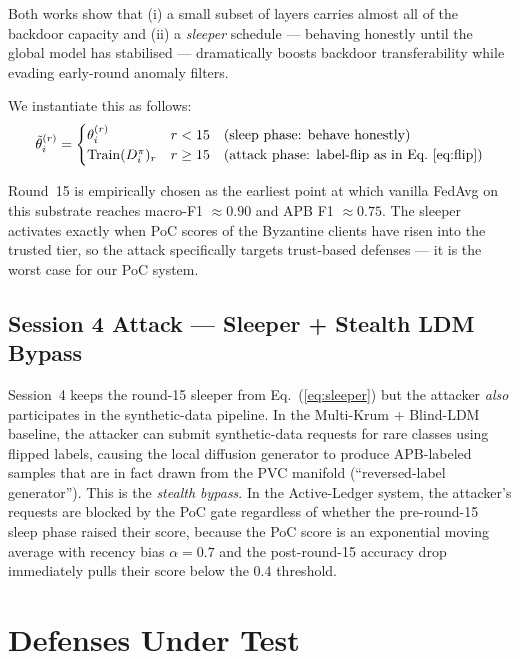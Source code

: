 \documentclass[11pt,a4paper]{article}
\begin{document}
Both works show that (i) a small subset of layers carries almost all of
the backdoor capacity and (ii) a \textit{sleeper} schedule --- behaving
honestly until the global model has stabilised --- dramatically boosts
backdoor transferability while evading early-round anomaly filters.

We instantiate this as follows:
\begin{equation}
\tilde{\theta}_{i}^{(r)} =
\begin{cases}
\theta_i^{(r)} & r < 15 \quad \text{(sleep phase: behave honestly)}\\
\operatorname{Train}(D_i^{\pi})_{r} & r \geq 15 \quad \text{(attack phase: label-flip as in Eq.~\ref{eq:flip})}
\end{cases}
\label{eq:sleeper}
\end{equation}

\begin{findingbox}
Round~15 is empirically chosen as the earliest point at which
vanilla FedAvg on this substrate reaches macro-F1 $\approx 0.90$ and
APB F1 $\approx 0.75$. The sleeper activates exactly when PoC scores
of the Byzantine clients have risen into the trusted tier, so the
attack specifically targets trust-based defenses --- it is the worst
case for our PoC system.
\end{findingbox}

\subsection{Session 4 Attack --- Sleeper + Stealth LDM Bypass}

Session~4 keeps the round-15 sleeper from Eq.~(\ref{eq:sleeper}) but the
attacker \textit{also} participates in the synthetic-data pipeline.
In the Multi-Krum + Blind-LDM baseline, the attacker can submit
synthetic-data requests for rare classes using flipped labels, causing the
local diffusion generator to produce APB-labeled samples that are in fact
drawn from the PVC manifold (``reversed-label generator''). This is the
\textit{stealth bypass}. In the Active-Ledger system, the attacker's
requests are blocked by the PoC gate regardless of whether the pre-round-15
sleep phase raised their score, because the PoC score is an exponential
moving average with recency bias $\alpha = 0.7$ and the post-round-15
accuracy drop immediately pulls their score below the $0.4$ threshold.

\section{Defenses Under Test}
\label{sec:defenses}
\end{document}
